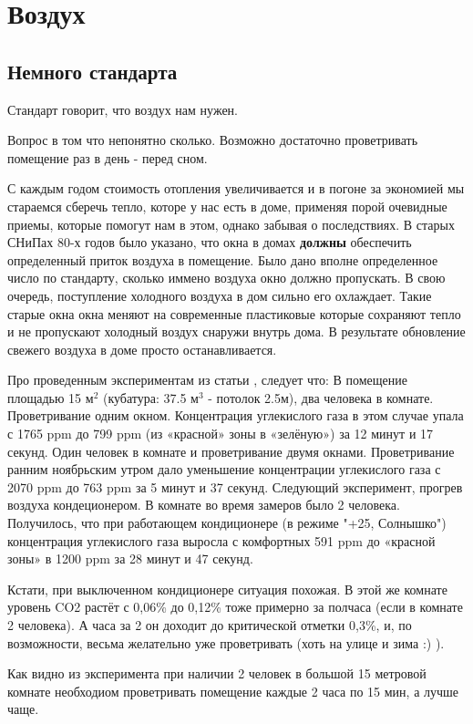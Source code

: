 \part{Воздух}
\chapter{Немного стандарта}
Стандарт говорит, что воздух нам нужен.

Вопрос в том что непонятно сколько. Возможно достаточно проветривать помещение раз в день - перед сном.

С каждым годом стоимость отопления увеличивается и в погоне за экономией мы стараемся сберечь тепло, которе у нас есть в доме, применяя порой очевидные приемы, которые помогут нам в этом, однако забывая о последствиях. В старых СНиПах 80-х годов было указано, что окна в домах \textbf{должны} обеспечить определенный приток воздуха в помещение. Было дано вполне определенное число по стандарту, сколько иммено воздуха окно должно пропускать. В свою очередь, поступление холодного воздуха в дом сильно его охлаждает. Такие старые окна окна меняют на современные пластиковые которые сохраняют тепло и не пропускают холодный воздух снаружи внутрь дома. В результате обновление свежего воздуха в доме просто останавливается. 

Про проведенным экспериментам из статьи \cite{co2}, следует что:
В помещение площадью 15 $\text{м}^{2}$ (кубатура: 37.5 $\text{м}^3$ - потолок 2.5м), два человека в комнате. 
Проветривание одним окном. Концентрация углекислого газа в этом случае упала с 1765 ppm до 799 ppm (из «красной» зоны в «зелёную») за 12 минут и 17 секунд.
Один человек в комнате и проветривание двумя окнами. 
Проветривание ранним ноябрьским утром дало уменьшение концентрации углекислого газа с 2070 ppm до 763 ppm за 5 минут и 37 секунд.
Следующий эксперимент, прогрев воздуха кондеционером.
В комнате во время замеров было 2 человека. Получилось, что при работающем кондиционере (в режиме "+25, Солнышко") концентрация углекислого газа выросла с комфортных 591 ppm до «красной зоны» в 1200 ppm за 28 минут и 47 секунд.

Кстати, при выключенном кондиционере ситуация похожая. В этой же комнате уровень CO2 растёт с 0,06\% до 0,12\% тоже примерно за полчаса (если в комнате 2 человека). А часа за 2 он доходит до критической отметки 0,3\%, и, по возможности, весьма желательно уже проветривать (хоть на улице и зима :) ).

Как видно из эксперимента при наличии 2 человек в большой 15 метровой комнате необходиом проветривать помещение каждые 2 часа по 15 мин, а лучше чаще.

